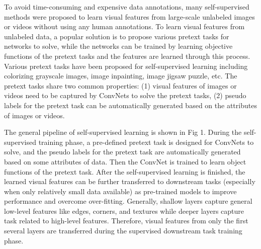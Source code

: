 \documentclass[conference]{IEEEtran}
\begin{document}
To avoid time-consuming and expensive data annotations, many self-supervised methods were proposed to learn visual features from large-scale unlabeled images or videos without using any human annotations.
To learn visual features from unlabeled data, a popular solution is to propose various pretext tasks for networks to solve, while the networks can be trained by learning objective functions of the pretext tasks and the features are learned through this process.
Various pretext tasks have been proposed for self-supervised learning including colorizing grayscale images, image inpainting, image jigsaw puzzle, etc. The pretext tasks share two common properties: (1) visual features of images or videos need to be captured by ConvNets to solve the pretext tasks,
(2) pseudo labels for the pretext task can be automatically generated based on the attributes of images or videos.

The general pipeline of self-supervised learning is shown in Fig 1. During the self-supervised training phase, a pre-defined pretext task is designed for ConvNets to solve, and the pseudo labels for the pretext task are automatically generated based on some attributes of data.
Then the ConvNet is trained to learn object functions of the pretext task. After the self-supervised learning is finished, the learned visual features can be further transferred to downstream tasks (especially when only relatively small data available) as pre-trained models to improve performance and overcome over-fitting.
Generally, shallow layers capture general low-level features like edges, corners, and textures while deeper layers capture task related to high-level features. Therefore, visual features from only the first several layers are transferred during the supervised downstream task training phase.
\end{document}

